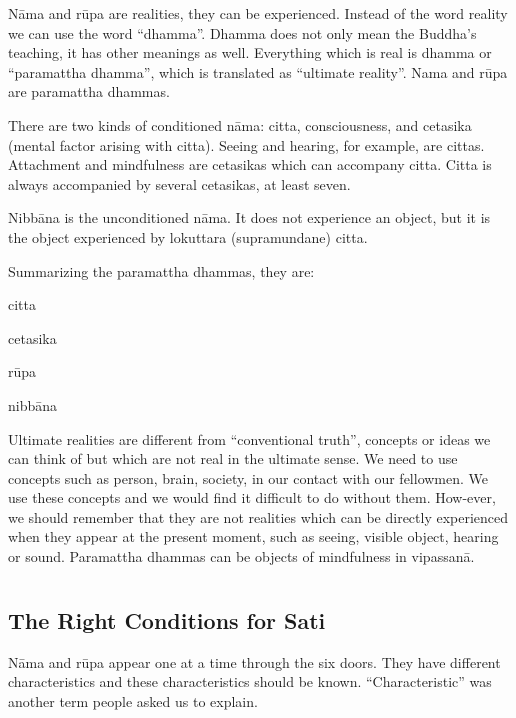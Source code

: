 Nāma and rūpa are realities, they can be experienced. Instead of the
word reality we can use the word ``dhamma''. Dhamma does not only mean
the Buddha's teaching, it has other meanings as well. Everything which
is real is dhamma or ``paramattha dhamma'', which is translated as
``ultimate reality''. Nama and rūpa are paramattha dhammas.

There are two kinds of conditioned nāma: citta, consciousness, and
cetasika (mental factor arising with citta). Seeing and hearing, for
example, are cittas. Attachment and mindfulness are cetasikas which can
accompany citta. Citta is always accompanied by several cetasikas, at
least seven.

Nibbāna is the unconditioned nāma. It does not experience an object, but
it is the object experienced by lokuttara (supramundane) citta.

Summarizing the paramattha dhammas, they are:

\begin{description}

\item citta
\item cetasika
\item rūpa
\item nibbāna

\end{description}

Ultimate realities are different from ``conventional truth'', concepts
or ideas we can think of but which are not real in the ultimate sense.
We need to use concepts such as person, brain, society, in our contact
with our fellowmen. We use these concepts and we would find it difficult
to do without them. How-ever, we should remember that they are not
realities which can be directly experienced when they appear at the
present moment, such as seeing, visible object, hearing or sound.
Paramattha dhammas can be objects of mindfulness in vipassanā.


\chapter[The Right Conditions for Sati]{}
\section*{The Right Conditions for Sati}

Nāma and rūpa appear one at a time through the six doors. They have
different characteristics and these characteristics should be known.
``Characteristic'' was another term people asked us to explain.

